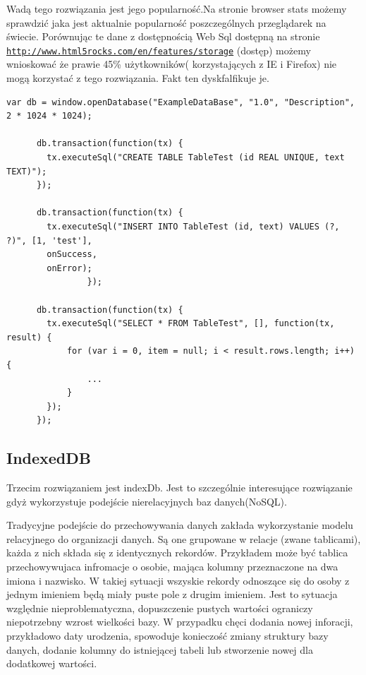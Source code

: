 Wadą tego rozwiązania jest jego popularność.Na stronie browser stats  możemy sprawdzić jaka jest aktualnie popularność poszczególnych przeglądarek na świecie. Porównując te dane z dostępnością Web Sql dostępną na stronie \underline{\texttt{http://www.html5rocks.com/en/features/storage}} (dostęp) możemy wnioskować że prawie 45\% użytkowników( korzystających z IE i Firefox) nie mogą korzystać z tego rozwiązania. Fakt ten dyskfalfikuje je.

\lstset{language=JavaScript}
\label{lis:webSql}
\begin{lstlisting}[caption=json]
      var db = window.openDatabase("ExampleDataBase", "1.0", "Description", 2 * 1024 * 1024);

      db.transaction(function(tx) {
        tx.executeSql("CREATE TABLE TableTest (id REAL UNIQUE, text TEXT)");
      });

      db.transaction(function(tx) {
        tx.executeSql("INSERT INTO TableTest (id, text) VALUES (?, ?)", [1, 'test'],
        onSuccess,
        onError);
                });

      db.transaction(function(tx) {
        tx.executeSql("SELECT * FROM TableTest", [], function(tx, result) {
            for (var i = 0, item = null; i < result.rows.length; i++) {
                ...
			}
        });
      });
\end{lstlisting}

\subsection{IndexedDB}
\label{subsec:indexDB}

Trzecim rozwiązaniem jest indexDb. Jest to szczególnie interesujące rozwiązanie gdyż wykorzystuje podejście nierelacyjnych baz danych(NoSQL).

Tradycyjne podejście do przechowywania danych zakłada wykorzystanie modelu relacyjnego do organizacji danych. Są one grupowane w relacje (zwane tablicami), każda z nich składa się z identycznych rekordów. Przykładem może być tablica przechowywujaca infromacje o osobie, mająca kolumny przeznaczone na dwa imiona i nazwisko. W takiej sytuacji wszyskie rekordy odnoszące się do osoby z jednym imieniem będą miały puste pole z drugim imieniem. Jest to sytuacja względnie nieproblematyczna, dopuszczenie pustych wartości ograniczy niepotrzebny wzrost wielkości bazy.
W przypadku chęci dodania nowej inforacji, przykładowo daty urodzenia, spowoduje konieczość zmiany struktury bazy danych, dodanie kolumny do istniejącej tabeli lub stworzenie nowej dla dodatkowej wartości.

